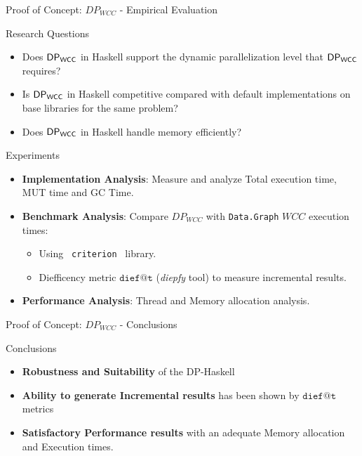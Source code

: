 \begin{frame}[fragile]{Proof of Concept: $DP_{WCC}$ - Empirical Evaluation}
  \begin{block}{Research Questions}
    \begin{itemize}
          \item Does $\mathsf{DP_{WCC}}$ in Haskell support the dynamic parallelization level that $\mathsf{DP_{WCC}}$ requires?
          \item Is $\mathsf{DP_{WCC}}$ in Haskell competitive compared with default implementations on base libraries for the same problem?
          \item Does $\mathsf{DP_{WCC}}$ in Haskell handle memory efficiently?
      \end{itemize}        
  \end{block}
  \begin{block}{Experiments}
    \begin{itemize}
      \item \textbf{Implementation Analysis}: Measure and analyze Total execution time, MUT time and GC Time.
      \item \textbf{Benchmark Analysis}: Compare $DP_{WCC}$ with \texttt{Data.Graph} $WCC$ execution times:
      \begin{itemize}
        \item Using \texttt{ criterion } library.
        \item Diefficency metric $\mathtt{dief@t}$ (\textit{diepfy} tool) to measure incremental results.
      \end{itemize}
      \item \textbf{Performance Analysis}: Thread and Memory allocation analysis.
    \end{itemize}
  \end{block}
\end{frame}

\begin{frame}[fragile]{Proof of Concept: $DP_{WCC}$ - Conclusions}
  \begin{block}{Conclusions}      

  \begin{itemize}
    \item \textbf{Robustness and Suitability} of the DP-Haskell 
    \item \textbf{Ability to generate Incremental results} has been shown by $\mathtt{dief@t}$ metrics
    \item \textbf{Satisfactory Performance results} with an adequate Memory allocation and Execution times. 
  \end{itemize}
\end{block}
\end{frame}

